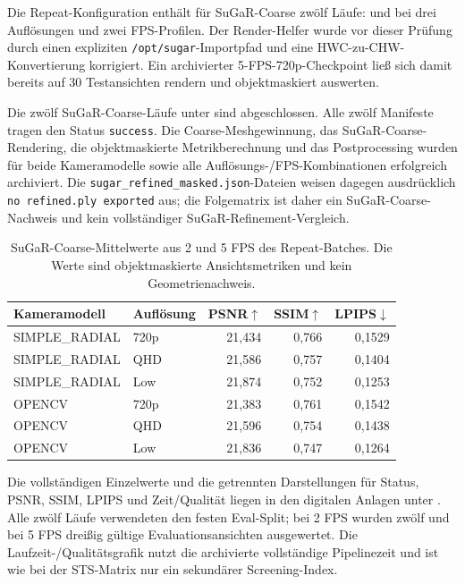 Die Repeat-Konfiguration  enthält für
SuGaR-Coarse zwölf Läufe:  und
 bei drei Auflösungen und zwei FPS-Profilen. Der
Render-Helfer wurde vor dieser Prüfung durch einen expliziten
\texttt{/opt/sugar}-Importpfad und eine HWC-zu-CHW-Konvertierung korrigiert.
Ein archivierter 5-FPS-720p-Checkpoint ließ sich damit bereits auf 30
Testansichten rendern und objektmaskiert auswerten.

Die zwölf SuGaR-Coarse-Läufe unter 
sind abgeschlossen. Alle zwölf Manifeste tragen den Status \texttt{success}.
Die Coarse-Meshgewinnung, das SuGaR-Coarse-Rendering, die objektmaskierte
Metrikberechnung und das Postprocessing wurden für beide Kameramodelle sowie
alle Auflösungs-/FPS-Kombinationen erfolgreich archiviert. Die
\texttt{sugar\_refined\_masked.json}-Dateien weisen dagegen ausdrücklich
\texttt{no refined.ply exported} aus; die Folgematrix ist daher ein
SuGaR-Coarse-Nachweis und kein vollständiger SuGaR-Refinement-Vergleich.

\begin{table}[H]
\centering
\small
\begin{tabularx}{\textwidth}{l l rrr}
\toprule
Kameramodell & Auflösung & PSNR$\uparrow$ & SSIM$\uparrow$ & LPIPS$\downarrow$\\
\midrule
SIMPLE\_RADIAL & 720p & 21,434 & 0,766 & 0,1529\\
SIMPLE\_RADIAL & QHD  & 21,586 & 0,757 & 0,1404\\
SIMPLE\_RADIAL & Low  & 21,874 & 0,752 & 0,1253\\
OPENCV         & 720p & 21,383 & 0,761 & 0,1542\\
OPENCV         & QHD  & 21,596 & 0,754 & 0,1438\\
OPENCV         & Low  & 21,836 & 0,747 & 0,1264\\
\bottomrule
\end{tabularx}
\caption{SuGaR-Coarse-Mittelwerte aus 2 und 5 FPS des Repeat-Batches. Die
Werte sind objektmaskierte Ansichtsmetriken und kein
Geometrienachweis.}
\label{tab:sugar-followup-average}
\end{table}

Die vollständigen Einzelwerte und die getrennten Darstellungen für Status,
PSNR, SSIM, LPIPS und Zeit/Qualität liegen in den digitalen Anlagen unter
. Alle zwölf Läufe verwendeten den
festen Eval-Split; bei 2 FPS wurden zwölf und bei 5 FPS dreißig gültige
Evaluationsansichten ausgewertet. Die Laufzeit-/Qualitätsgrafik nutzt die
archivierte vollständige Pipelinezeit und ist wie bei der STS-Matrix nur ein
sekundärer Screening-Index.

